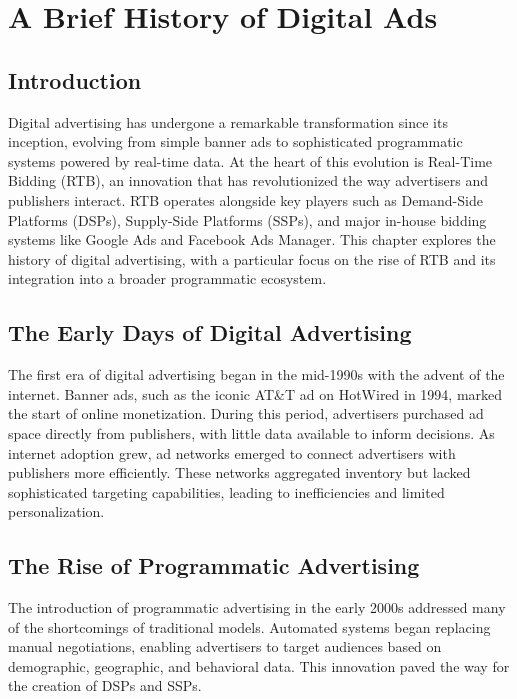 \documentclass[../main.tex]{subfiles}
\begin{document}
	\chapter{A Brief History of Digital Ads}
	
	
	\section*{Introduction}
	
	Digital advertising has undergone a remarkable transformation since its inception, evolving from simple banner ads to sophisticated programmatic systems powered by real-time data. At the heart of this evolution is Real-Time Bidding (RTB), an innovation that has revolutionized the way advertisers and publishers interact. RTB operates alongside key players such as Demand-Side Platforms (DSPs), Supply-Side Platforms (SSPs), and major in-house bidding systems like Google Ads and Facebook Ads Manager. This chapter explores the history of digital advertising, with a particular focus on the rise of RTB and its integration into a broader programmatic ecosystem.
	
	\section*{The Early Days of Digital Advertising}
	The first era of digital advertising began in the mid-1990s with the advent of the internet. Banner ads, such as the iconic AT\&T ad on HotWired in 1994, marked the start of online monetization. During this period, advertisers purchased ad space directly from publishers, with little data available to inform decisions. 
	As internet adoption grew, ad networks emerged to connect advertisers with publishers more efficiently. These networks aggregated inventory but lacked sophisticated targeting capabilities, leading to inefficiencies and limited personalization.
	
	\section*{The Rise of Programmatic Advertising}
	
	The introduction of programmatic advertising in the early 2000s addressed many of the shortcomings of traditional models. Automated systems began replacing manual negotiations, enabling advertisers to target audiences based on demographic, geographic, and behavioral data. This innovation paved the way for the creation of DSPs and SSPs.
	
\end{document}
